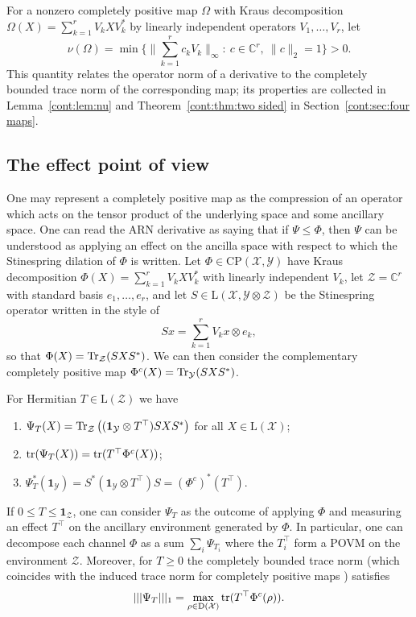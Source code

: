  For a nonzero completely positive map $\Omega$ with Kraus decomposition $\Omega(X)=\sum_{k=1}^rV_kXV_k^*$ by linearly independent operators $V_1,\dots,V_r$, let
\[
\nu(\Omega)=\min\Big\{\Big\|\sum_{k=1}^rc_kV_k\Big\|_\infty:\ c\in\mathbb{C}^r,\ \|c\|_2=1\Big\}>0 .
\]
This quantity relates the operator norm of a derivative to the completely bounded trace norm of the corresponding map; its properties are collected in Lemma~\ref{cont:lem:nu} and Theorem~\ref{cont:thm:two sided} in Section~\ref{cont:sec:four maps}.

 
\subsection{The effect point of view}
 
One may represent a completely positive map as the compression of an operator which acts on the tensor product of the underlying space and some ancillary space. One can read the ARN derivative as saying that if $\Psi\leq \Phi$, then $\Psi$ can be understood as applying an effect on the ancilla space with respect to which the Stinespring dilation \cite{Stinespring1955} of $\Phi$ is written. 
Let $\Phi\in \mathrm{CP}(\mathcal{X},\mathcal{Y})$ have Kraus decomposition $\Phi(X)=\sum_{k=1}^rV_kXV_k^*$ with linearly independent $V_k$, let $\mathcal{Z}=\mathbb{C}^r$ with standard basis $e_1,\dots,e_r$, and let $S\in \mathrm{L}(\mathcal{X},\mathcal{Y}\otimes\mathcal{Z})$ be the Stinespring operator written in the style of  \cite[Section~2.2.2]{watrous2018theory}
\[Sx=\sum_{k=1}^r V_kx\otimes e_k,\]
so that $\Phi(X)=\operatorname{Tr}_{\mathcal{Z}}(SXS^*)$. We can then consider the complementary completely positive map \cite{DevetakShor2005} 
$\Phi^c(X)=\operatorname{Tr}_{\mathcal{Y}}(SXS^*)$. 
\begin{theorem}\label{cont:effect theorem}
    For Hermitian $T\in \mathrm{L}(\mathcal{Z})$ we have 
    \begin{enumerate}
        \item $\Psi_T(X)=\operatorname{Tr}_{\mathcal{Z}}\left( (\mathbf{1}_{\mathcal{Y}}\otimes T^\top)SXS^* \right)$ for all $X\in \mathrm{L}(\mathcal{X})$;
        \item $\operatorname{tr}(\Psi_T(X))=\operatorname{tr}(T^\top\Phi^c(X))$;
        \item $\Psi_T^*(\mathbf{1}_{\mathcal{Y}})=S^*(\mathbf{1}_{\mathcal{Y}}\otimes T^\top)S=(\Phi^c)^*(T^\top)$.
    \end{enumerate}
 If $0\leq T\leq \mathbf{1}_{\mathcal{Z}}$, one can consider $\Psi_T$ as the outcome of applying $\Phi$ and measuring an effect $T^\top$ on the ancillary environment generated by $\Phi$. In particular, one can decompose each channel $\Phi$ as a sum $\sum_{i} \Psi_{T_i}$ where the $T_i^\top$ form a POVM on the environment $\mathcal{Z}$. Moreover, for $T\geq 0$ the completely bounded trace norm (which coincides with the induced trace norm for completely positive maps \cite{Paulsen2003}) satisfies 
 \[
     |||\Psi_T|||_1=\max_{\rho\in \mathrm{D}(\mathcal{X})}\operatorname{tr}(T^\top\Phi^c(\rho)).
 \]
\end{theorem}

